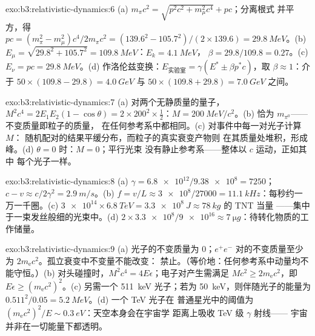 \begin{solution}{exo:b3:relativistic-dynamics:6}
(a) $m_\pi c^2 = \sqrt{p^2c^2 + m_\mu^2c^4} + pc$；分离根式
并平方，得 $pc = (m_\pi^2 - m_\mu^2)c^4/2m_\pi c^2 =
(139.6^2 - 105.7^2)/(2 \times 139.6) = \qty{29.8}{MeV}$。(b) $E_\mu =
\sqrt{29.8^2 + 105.7^2} = \qty{109.8}{MeV}$：$E_k = \qty{4.1}{MeV}$，
$\beta = 29.8/109.8 = 0.27$。(c) $E_\nu = pc = \qty{29.8}{MeV}$。(d)
作洛伦兹变换：$E_{\text{实验室}} = \gamma(E^* \pm \beta p^*c)$，取 $\beta
\approx 1$：介于 $50 \times (109.8 - 29.8) = \qty{4.0}{GeV}$ 与
$50 \times (109.8 + 29.8) = \qty{7.0}{GeV}$ 之间。
\end{solution}

\begin{solution}{exo:b3:relativistic-dynamics:7}
(a) 对两个无静质量的量子，$M^2c^4 = 2E_1E_2(1 - \cos\theta) =
2 \times 200^2 \times \tfrac12$：$M = \qty{200}{MeV}/c^2$。(b)
恰为 $m_{\pi^0}$——不变质量即粒子的质量，
在任何参考系中都相同。(c) 对事件中每一对光子计算 $M$：
随机配对的结果平缓分布，而粒子的真实衰变产物则
在其质量处堆积，形成峰。(d) $\theta = 0$ 时：$M = 0$；平行光束
没有静止参考系——整体以 $c$ 运动，正如其中
每个光子一样。
\end{solution}

\begin{solution}{exo:b3:relativistic-dynamics:8}
(a) $\gamma = \num{6.8e12}/\num{9.38e8} = 7250$；$c - v \approx
c/2\gamma^2 = \qty{2.9}{m/s}$。(b) $f = v/L \approx \num{3e8}/27000 =
\qty{11.1}{kHz}$：每秒约一万一千圈。(c) $\num{3e14}
\times \qty{6.8}{TeV} = \qty{3.3e8}{J} \approx \qty{78}{kg}$ 的 TNT 当量
——集中于一束发丝般细的光束中。(d) $2 \times \num{3.3e8}/\num{9e16} \approx
\qty{7}{\micro g}$：待转化物质的工作储量。
\end{solution}

\begin{solution}{exo:b3:relativistic-dynamics:9}
(a) 光子的不变质量为 $0$；$e^+e^-$ 对的不变质量至少为
$2m_{\text{e}}c^2$。孤立衰变中不变量不能改变：
禁止。（等价地：任何参考系中动量均不能守恒。）(b)
对头碰撞时，$M^2c^4 = 4E\epsilon$；电子对产生需满足 $Mc^2 \ge
2m_{\text{e}}c^2$，即 $E\epsilon \ge (m_{\text{e}}c^2)^2$。(c)
另需一个 \qty{511}{keV} 光子；若为 \qty{50}{keV}，则伴随光子的能量为
$0.511^2/0.05 = \qty{5.2}{MeV}$。(d) 一个 TeV 光子在
普通星光中的阈值为 $(m_{\text{e}}c^2)^2/E \sim \qty{0.3}{eV}$：天空本身会在宇宙学
距离上吸收 TeV 级 $\gamma$ 射线——
宇宙并非在一切能量下都透明。
\end{solution}

